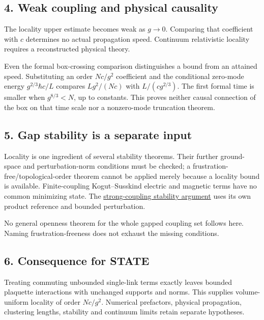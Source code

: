 \documentclass[11pt,a4paper]{article}
\begin{document}
\hypertarget{weak-coupling-and-physical-causality}{%
\subsection{4. Weak coupling and physical
causality}\label{weak-coupling-and-physical-causality}}

The locality upper estimate becomes weak as \(g\to0\). Comparing that
coefficient with \(c\) determines no actual propagation speed. Continuum
relativistic locality requires a reconstructed physical theory.

Even the formal box-crossing comparison distinguishes a bound from an
attained speed. Substituting an order \(Nc/g^2\) coefficient and the
conditional zero-mode energy \(g^{2/3}\hbar c/L\) compares \(Lg^2/(Nc)\)
with \(L/(cg^{2/3})\). The first formal time is smaller when
\(g^{8/3}<N\), up to constants. This proves neither causal connection of
the box on that time scale nor a nonzero-mode truncation theorem.

\hypertarget{gap-stability-is-a-separate-input}{%
\subsection{5. Gap stability is a separate
input}\label{gap-stability-is-a-separate-input}}

Locality is one ingredient of several stability theorems. Their further
ground-space and perturbation-norm conditions must be checked; a
frustration-free/topological-order theorem cannot be applied merely
because a locality bound is available. Finite-coupling Kogut--Susskind
electric and magnetic terms have no common minimizing state. The
\href{strong-coupling-uniform-gap.md}{strong-coupling stability
argument} uses its own product reference and bounded perturbation.

No general openness theorem for the whole gapped coupling set follows
here. Naming frustration-freeness does not exhaust the missing
conditions.

\hypertarget{consequence-for-state}{%
\subsection{6. Consequence for STATE}\label{consequence-for-state}}

Treating commuting unbounded single-link terms exactly leaves bounded
plaquette interactions with unchanged supports and norms. This supplies
volume-uniform locality of order \(Nc/g^2\). Numerical prefactors,
physical propagation, clustering lengths, stability and continuum limits
retain separate hypotheses.
\end{document}
